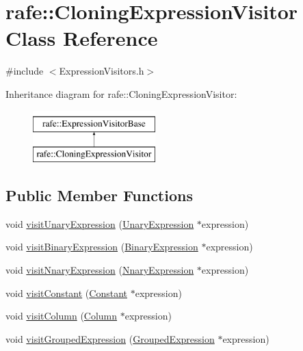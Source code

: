 \hypertarget{classrafe_1_1_cloning_expression_visitor}{\section{rafe\+:\+:Cloning\+Expression\+Visitor Class Reference}
\label{classrafe_1_1_cloning_expression_visitor}
}


{\ttfamily \#include $<$Expression\+Visitors.\+h$>$}

Inheritance diagram for rafe\+:\+:Cloning\+Expression\+Visitor\+:\begin{figure}[H]
\begin{center}
\leavevmode
\includegraphics[height=2.000000cm]{classrafe_1_1_cloning_expression_visitor}
\end{center}
\end{figure}
\subsection*{Public Member Functions}
\begin{DoxyCompactItemize}
\item 
void \hyperlink{classrafe_1_1_cloning_expression_visitor_a3b71db5c48bc772a4b8bf52a79ff1e83}{visit\+Unary\+Expression} (\hyperlink{classrafe_1_1_unary_expression}{Unary\+Expression} $\ast$expression)
\item 
void \hyperlink{classrafe_1_1_cloning_expression_visitor_a021e146e191a9fce4b7b82f0c4b4efd4}{visit\+Binary\+Expression} (\hyperlink{classrafe_1_1_binary_expression}{Binary\+Expression} $\ast$expression)
\item 
void \hyperlink{classrafe_1_1_cloning_expression_visitor_ad40e5659edc1098b8465ea64eaeea7cd}{visit\+Nnary\+Expression} (\hyperlink{classrafe_1_1_nnary_expression}{Nnary\+Expression} $\ast$expression)
\item 
void \hyperlink{classrafe_1_1_cloning_expression_visitor_a1fc965624f46b446b7836fc274962f02}{visit\+Constant} (\hyperlink{classrafe_1_1_constant}{Constant} $\ast$expression)
\item 
void \hyperlink{classrafe_1_1_cloning_expression_visitor_a0182fb9588af653201a5450935cf0b87}{visit\+Column} (\hyperlink{classrafe_1_1_column}{Column} $\ast$expression)
\item 
void \hyperlink{classrafe_1_1_cloning_expression_visitor_a54f879bde3c538a907782a32e1eee492}{visit\+Grouped\+Expression} (\hyperlink{classrafe_1_1_grouped_expression}{Grouped\+Expression} $\ast$expression)
\end{DoxyCompactItemize}

